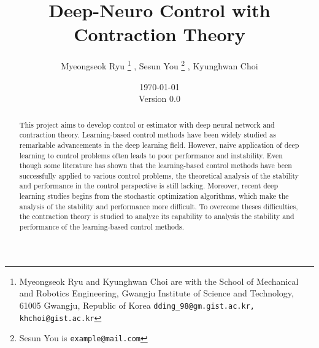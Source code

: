 \documentclass{article}
\title{
    Deep-Neuro Control with Contraction Theory
}
\author{
    Myeongseok Ryu
    \thanks{Myeongseok Ryu and Kyunghwan Choi are with the School of Mechanical and Robotics Engineering, Gwangju Institute of Science and Technology, 61005 Gwangju, Republic of Korea {\tt\small dding\_98@gm.gist.ac.kr, khchoi@gist.ac.kr}}%
    ,
    Sesun You
    \thanks{Sesun You is 
        {\tt\small example@mail.com}}%
    ,
    Kyunghwan Choi
    \footnotemark[1]
}
\date{
    \today
    \\
    Version 0.0
}
\newcommand*{\template}{../dding_template}
\begin{document}
\maketitle

\begin{abstract}
    This project aims to develop control or estimator with deep neural network and contraction theory.
    Learning-based control methods have been widely studied as remarkable advancements in the deep learning field.
    However, naive application of deep learning to control problems often leads to poor performance and instability.
    Even though some literature has shown that the learning-based control methods have been successfully applied to various control problems, the theoretical analysis of the stability and performance in the control perspective is still lacking.
    Moreover, recent deep learning studies begins from the stochastic optimization algorithms, which make the analysis of the stability and performance more difficult.
    To overcome theses difficulties, the contraction theory is studied to analyze its capability to analysis the stability and performance of the learning-based control methods.
\end{abstract}

\tableofcontents









\begin{appendices}
\end{appendices}




\end{document}
